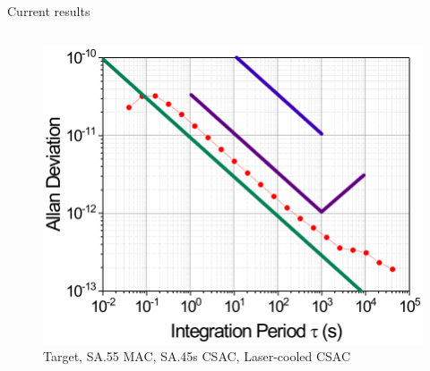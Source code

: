 \begin{frame}{Current results}
\begin{columns}[T, onlytextwidth]
\begin{column}{0.5\textwidth}
            \begin{figure}
                \centering
                \includegraphics[height=0.45\textheight]{img/laser-cooled-alkali-metals-stability.png}
                \caption{
                    \textcolor[HTML]{006C43}{Target},
                    \textcolor[HTML]{4C0062}{SA.55 MAC},
                    \textcolor[HTML]{3700A7}{SA.45s CSAC},
                    \textcolor[HTML]{CA0200}{Laser-cooled CSAC}
                }
            \end{figure}

        \end{column}

    \end{columns}

\end{frame}